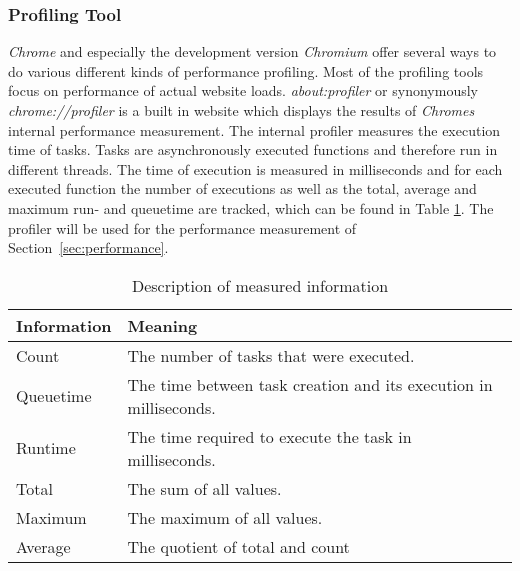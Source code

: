 \subsubsection{Profiling Tool}
\label{sec:profiler}
\emph{Chrome} and especially the development version \emph{Chromium} offer several ways to do various different kinds of performance profiling. Most of the profiling tools focus on performance of actual website loads. \emph{about:profiler} or synonymously \emph{chrome://profiler} is a built in website which displays the results of \emph{Chromes} internal performance measurement. The internal profiler measures the execution time of tasks. Tasks are asynchronously executed functions and therefore run in different threads. The time of execution is measured in milliseconds and for each executed function the number of executions as well as the total, average and maximum run- and queuetime are tracked, which can be found in Table \ref{fig:ex1_info}. The profiler will be used for the performance measurement of Section~\ref{sec:performance}.
\begin{table}
\caption{Description of measured information}
\label{fig:ex1_info}
\begin{tabularx}{\textwidth}{|l|X|}
\hline
Information & Meaning \\ \hline
Count & The number of tasks that were executed. \\ \hline
Queuetime & The time between task creation and its execution in milliseconds. \\ \hline
Runtime & The time required to execute the task in milliseconds. \\ \hline
Total & The sum of all values. \\ \hline
Maximum & The maximum of all values. \\ \hline
Average & The quotient of total and count \\ \hline
\end{tabularx}
\end{table}